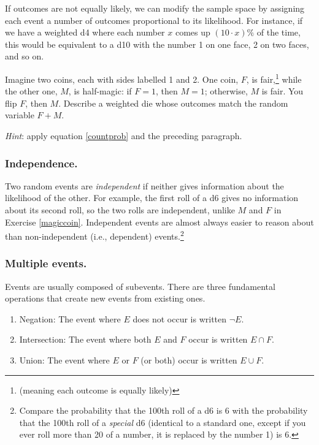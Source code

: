 \documentclass{book}
\begin{document}
If outcomes are not equally likely, we can modify the sample space by assigning each event a number of outcomes proportional to its likelihood. For instance, if we have a weighted d4 where each number $x$ comes up $(10\cdot x)\%$ of the time, this would be equivalent to a d10 with the number 1 on one face, 2 on two faces, and so on. 
\begin{exercise}\label{magiccoin}
  Imagine two coins, each with sides labelled 1 and 2. One coin, $F$, is fair,\footnote{(meaning each outcome is equally likely)} while the other one, $M$, is half-magic: if $F = 1$, then $M = 1$; otherwise, $M$ is fair. You flip $F$, then $M$. Describe a weighted die whose outcomes match the random variable $F + M$.

\noindent\emph{Hint}: apply equation \eqref{countprob} and the preceding paragraph.
\end{exercise}


\subsubsection*{Independence.}
Two random events are \emph{independent} if neither gives information about the likelihood of the other. For example, the first roll of a d6 gives no information about its second roll, so the two rolls are independent, unlike $M$ and $F$ in Exercise \ref{magiccoin}. Independent events are almost always easier to reason about than non-independent (i.e., dependent) events.\footnote{Compare the probability that the 100th roll of a d6 is 6 with the probability that the 100th roll of a \emph{special} d6 (identical to a standard one, except if you ever roll more than 20 of a number, it is replaced by the number 1) is 6.}

\subsubsection*{Multiple events.}
Events are usually composed of subevents. There are three fundamental operations that create new events from existing ones.
\begin{enumerate}[label = (\arabic*)]
\item Negation: The event where $E$ does not occur is written $\neg E$.
\item\label{intersection} Intersection:
The event where both $E$ and $F$ occur is written $\displaystyle E \cap F$.
\item Union:  The event where $E$ or $F$ (or both) occur is written $E \cup F$.
\end{enumerate}
\end{document}
